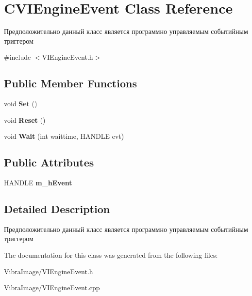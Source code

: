 \hypertarget{class_c_v_i_engine_event}{\section{C\+V\+I\+Engine\+Event Class Reference}
\label{class_c_v_i_engine_event}
}


Предположительно данный класс является программно управляемым событийным триггером  




{\ttfamily \#include $<$V\+I\+Engine\+Event.\+h$>$}

\subsection*{Public Member Functions}
\begin{DoxyCompactItemize}
\item 
\hypertarget{class_c_v_i_engine_event_ac8b45598bd3dc7c78d7a282c5c9da31c}{void {\bfseries Set} ()}\label{class_c_v_i_engine_event_ac8b45598bd3dc7c78d7a282c5c9da31c}

\item 
\hypertarget{class_c_v_i_engine_event_aca0e4a51d2caf10abc279951b16caf45}{void {\bfseries Reset} ()}\label{class_c_v_i_engine_event_aca0e4a51d2caf10abc279951b16caf45}

\item 
\hypertarget{class_c_v_i_engine_event_a7df18564e4e71869ffd52ddf7ae9abc3}{void {\bfseries Wait} (int waittime, H\+A\+N\+D\+L\+E evt)}\label{class_c_v_i_engine_event_a7df18564e4e71869ffd52ddf7ae9abc3}

\end{DoxyCompactItemize}
\subsection*{Public Attributes}
\begin{DoxyCompactItemize}
\item 
\hypertarget{class_c_v_i_engine_event_a46978ca1891c378503c533b3a5b714ef}{H\+A\+N\+D\+L\+E {\bfseries m\+\_\+h\+Event}}\label{class_c_v_i_engine_event_a46978ca1891c378503c533b3a5b714ef}

\end{DoxyCompactItemize}


\subsection{Detailed Description}
Предположительно данный класс является программно управляемым событийным триггером 



The documentation for this class was generated from the following files\+:\begin{DoxyCompactItemize}
\item 
Vibra\+Image/V\+I\+Engine\+Event.\+h\item 
Vibra\+Image/V\+I\+Engine\+Event.\+cpp\end{DoxyCompactItemize}
